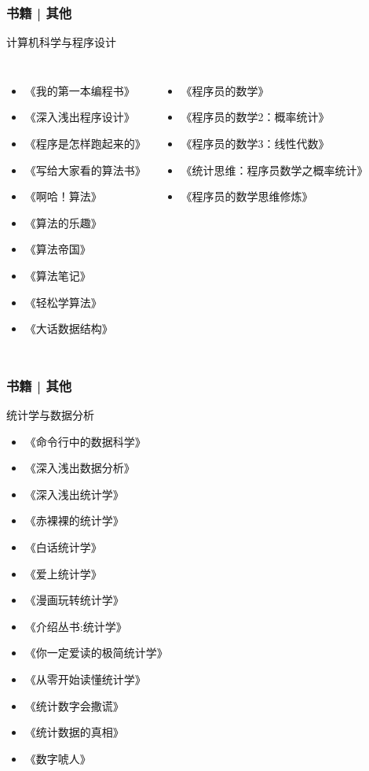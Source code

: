 \begin{frame}
  \frametitle{书籍 | 其他}
  \begin{block}{计算机科学与程序设计}
    \begin{columns}
    \begin{itemize}
      \item 《我的第一本编程书》
      \item 《深入浅出程序设计》
      \item 《程序是怎样跑起来的》
      \item 《写给大家看的算法书》
      \item 《啊哈！算法》
      \item 《算法的乐趣》
      \item 《算法帝国》
      \item 《算法笔记》
      \item 《轻松学算法》
      \item 《大话数据结构》
    \end{itemize}
    \begin{itemize}
      \item 《程序员的数学》
      \item 《程序员的数学2：概率统计》
      \item 《程序员的数学3：线性代数》
      \item 《统计思维：程序员数学之概率统计》
      \item 《程序员的数学思维修炼》
    \end{itemize}
  \end{columns}
  \end{block}
\end{frame}

\begin{frame}
  \frametitle{书籍 | 其他}
    \begin{block}{统计学与数据分析}
      \begin{multicols}{2}
    \begin{itemize}
      \item 《命令行中的数据科学》
      \item 《深入浅出数据分析》
      \item 《深入浅出统计学》
      \item 《赤裸裸的统计学》
      \item 《白话统计学》
      \item 《爱上统计学》
      \item 《漫画玩转统计学》
      \item 《介绍丛书:统计学》
      \item 《你一定爱读的极简统计学》
      \item 《从零开始读懂统计学》
      \item 《统计数字会撒谎》
      \item 《统计数据的真相》
      \item 《数字唬人》
    \end{itemize}
  \end{multicols}
  \end{block}
\end{frame}

